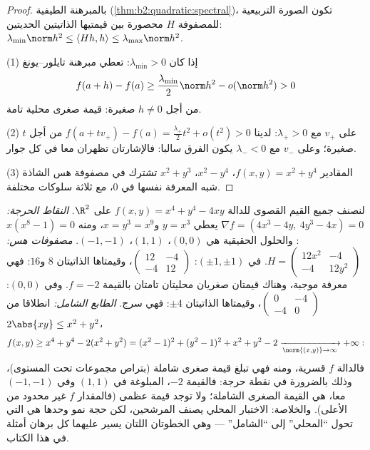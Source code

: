\begin{proof}
بالمبرهنة الطيفية (\cref{thm:b2:quadratic:spectral})، تكون الصورة التربيعية للمصفوفة $H$
محصورة بين قيمتيها الذاتيتين الحديتين:
$\lambda_{\min}\norm h^2 \leq \langle Hh, h\rangle \leq
\lambda_{\max}\norm h^2$.

(1) إذا كان $\lambda_{\min} > 0$: تعطي مبرهنة تايلور--يونغ
\[
f(a + h) - f(a) \geq \frac{\lambda_{\min}}{2}\norm h^2 -
o(\norm h^2) > 0
\]
من أجل $h \neq 0$ صغيرة: قيمة صغرى محلية تامة.

(2) على  $v_+$ مع $\lambda_+ > 0$: لدينا $f(a + tv_+) -
f(a) = \frac{\lambda_+}{2}t^2 + o(t^2) > 0$ من أجل $t$ صغيرة؛
وعلى $v_-$ مع $\lambda_- < 0$ يكون الفرق سالبا: فالإشارتان تظهران معا في كل
جوار.

(3) المقادير $f(x,y) = x^2 + y^4$، $x^2 - y^4$، $x^2 + y^3$ تشترك في مصفوفة هس الشاذة شبه
المعرفة نفسها في $0$، مع ثلاثة سلوكات مختلفة.
\end{proof}

\begin{example}\label{ex:b2:diffcalc:quarticrun}
لنصنف جميع القيم القصوى للدالة $f(x, y) = x^4 + y^4 - 4xy$ على $\R^2$.
\emph{النقاط الحرجة:} $\nabla f = (4x^3 - 4y,\ 4y^3 - 4x) =
0$ يعطي $y = x^3$ و$x = y^3 = x^9$، ومنه $x(x^8 - 1) = 0$:
والحلول الحقيقية هي $(0,0)$، $(1,1)$، $(-1,-1)$.
\emph{مصفوفات هس:} $H = \begin{pmatrix} 12x^2 & -4\\ -4 &
12y^2\end{pmatrix}$. في $(\pm1, \pm1)$: $\begin{pmatrix} 12 &
-4\\ -4 & 12\end{pmatrix}$، وقيمتاها الذاتيتان $8$
و$16$: فهي معرفة موجبة، وهناك قيمتان صغريان محليتان تامتان
بالقيمة $f = -2$. وفي $(0,0)$: $\begin{pmatrix} 0 & -4\\ -4 & 0\end{pmatrix}$، وقيمتاها الذاتيتان $\pm4$: فهي سرج.
\emph{الطابع الشامل:} انطلاقا من $2\abs{xy} \leq x^2 +
y^2$،
\[
f(x, y) \geq x^4 + y^4 - 2(x^2 + y^2)
= (x^2 - 1)^2 + (y^2 - 1)^2 + x^2 + y^2 - 2
\xrightarrow[\norm{(x,y)}\to\infty]{} +\infty :
\]
فالدالة $f$ قسرية، ومنه فهي تبلغ قيمة صغرى شاملة (بتراص مجموعات
تحت المستوى)، وذلك بالضرورة في نقطة حرجة: فالقيمة $-2$، المبلوغة
في $(1,1)$ وفي $(-1,-1)$ معا، هي القيمة الصغرى الشاملة؛ ولا توجد قيمة
عظمى (فالمقدار $f$ غير محدود من الأعلى). والخلاصة: الاختبار
المحلي يصنف المرشحين، لكن حجة نمو وحدها هي التي تحول ``المحلي'' إلى
``الشامل'' --- وهي الخطوتان اللتان يسير عليهما كل برهان أمثلة في هذا
الكتاب.
\end{example}

